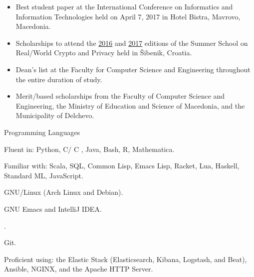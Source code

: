 \documentclass[version=last, paper=A4, DIV=12, toc=bibliography]{scrartcl}%
\newcommand{\CC}{%
  C\nolinebreak%
  \hspace{-.05em}\raisebox{.4ex}{\relsize{-3}{\textbf{+}}}\nolinebreak%
  \hspace{-.10em}\raisebox{.4ex}{\relsize{-3}{\textbf{+}}}%
}
\begin{document}
\begin{itemize}
\item Best student paper at the  International Conference on
  Informatics and Information Technologies held on April 7, 2017
  in Hotel Bistra, Mavrovo, Macedonia.
\item Scholarships to attend the
  \href{http://summerschool-croatia.cs.ru.nl/2016/}{2016} and
  \href{http://summerschool-croatia.cs.ru.nl/2017/}{2017} editions of
  the Summer School on Real\-/World Crypto and Privacy held in
  Šibenik, Croatia.
\item Dean's list at the \textsf{Faculty for Computer Science and
    Engineering} throughout the entire duration of study.
\item Merit\-/based scholarships from the \textsf{Faculty of Computer
    Science and Engineering}, the \textsf{Ministry of Education and
    Science of Macedonia}, and the \textsf{Municipality of Delchevo}.
\end{itemize}


\begingroup
{}
\begin{labeling}[~--]{Programming Languages}
\item[Programming Languages] Fluent in: Python, C/\CC, Java, Bash, R,
  Mathematica\textsuperscript{\textregistered}.

  Familiar with: Scala, SQL, Common Lisp, Emacs Lisp, Racket, Lua, Haskell,
  Standard ML, JavaScript.
\item[Operating Systems] GNU/Linux (Arch Linux and Debian).
\item[Text Editors and IDEs] GNU Emacs and IntelliJ IDEA\@.
\item[Document Preparation] .
\item[Version Control] Git.
\item[Miscellaneous] Proficient using: the Elastic Stack
  (Elasticsearch, Kibana, Logstash, and Beat), Ansible, NGINX, and the
  Apache HTTP Server.
\end{labeling}
\endgroup

\printbibliography[title=Publications]
\end{document}
